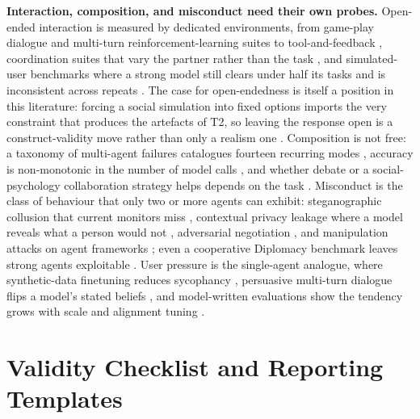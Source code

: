 \documentclass[11pt]{article}
\begin{document}
\textbf{Interaction, composition, and misconduct need their own probes.}
Open-ended interaction is measured by dedicated environments, from game-play
dialogue \cite{chalamalasetti2023clembench} and multi-turn reinforcement-learning
suites \cite{abdulhai2023lmrlgym} to tool-and-feedback \cite{wang2024mint},
coordination suites that vary the partner rather than the task
\cite{agashe2023llmcoordination}, and simulated-user benchmarks where a strong
model still clears under half its tasks and is inconsistent across repeats
\cite{yao2024taubench}. The case for open-endedness is itself a position in this
literature: forcing a social simulation into fixed options imports the very
constraint that produces the artefacts of T2, so leaving the response open is a
construct-validity move rather than only a realism one
\cite{ma2025openended,zhou2024sotopia}. Composition is not
free: a taxonomy of multi-agent failures catalogues fourteen recurring modes
\cite{cemri2025mast}, accuracy is non-monotonic in the number of model calls
\cite{chen2024llmcalls}, and whether debate or a social-psychology collaboration
strategy helps depends on the task
\cite{du2023debate,zhang2024collab}. Misconduct is the class of behaviour that
only two or more agents can exhibit: steganographic collusion that current
monitors miss \cite{motwani2024collusion}, contextual privacy leakage where a
model reveals what a person would not \cite{mireshghallah2024confaide},
adversarial negotiation \cite{abdelnabi2023negotiation}, and manipulation attacks
on agent frameworks \cite{tian2023evilgeniuses}; even a cooperative Diplomacy
benchmark leaves strong agents exploitable \cite{mukobi2023welfare}. User
pressure is the single-agent analogue, where synthetic-data finetuning reduces
sycophancy \cite{wei2023sycophancy}, persuasive multi-turn dialogue flips a
model's stated beliefs \cite{xu2024earthflat}, and model-written evaluations show
the tendency grows with scale and alignment tuning \cite{perez2023modeleval}.

\section{Validity Checklist and Reporting Templates}
\label{app:templates}
\end{document}
